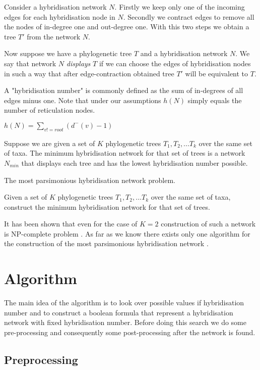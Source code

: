 \documentclass[runningheads, envcountsame, a4paper]{llncs}
\begin{document}
Consider a hybridisation network $N$. Firstly we keep only one of the incoming edges for each hybridisation node in $N$. 
Secondly we contract edges to remove all the nodes of in-degree one and out-degree one. With this two steps we obtain a 
tree $T'$ from the network $N$.

Now suppose we have a phylogenetic tree $T$ and a hybridisation network $N$. We say that network $N$ \emph{displays} $T$ 
if we can choose the edges of hybridisation nodes in such a way that after edge-contraction obtained tree $T'$ will be 
equivalent to $T$.

A "hybridisation number" is commonly defined as the sum of in-degrees of all edges minus one. Note that under our 
assumptions $h(N)$ simply equals the number of reticulation nodes.

$h(N) = \sum\limits_{v != root} (d^-(v) - 1)$

Suppose we are given a set of $K$ phylogenetic trees $T_1, T_2, ... T_k$ over the same set of taxa. The minimum 
hybridisation network for that set of trees is a network $N_{min}$ that displays each tree and has the lowest 
hybridisation number possible.

The most parsimonious hybridisation network problem.

Given a set of $K$ phylogenetic trees $T_1, T_2, ... T_k$ over the same set of taxa, construct the minimum hybridisation 
network for that set of trees.

It has been shown that even for the case of $K=2$ construction of such a network is NP-complete problem 
\cite {bordewich2007computing}. As far as we know there exists only one algorithm for the construction of the most 
parsimonious hybridisation network \cite {wu2013algorithm}.


\section{Algorithm}

The main idea of the algorithm is to look over possible values if hybridisation number and to construct a boolean 
formula that represent a hybridisation network with fixed hybridisation number. Before doing this search we do some 
pre-processing and consequently some post-processing after the network is found.


\subsection{Preprocessing}
\end{document}
